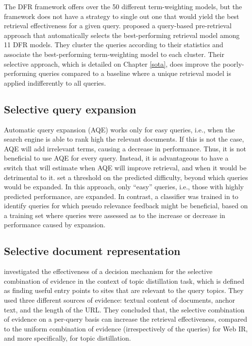 The DFR framework offers over the 50 different term-weighting models, but the framework does not have a strategy to single out one that would yield the best retrieval effectiveness for a given query.
\citet{uglasgow.robust,ModelSelection} proposed a query-based pre-retrieval approach that automatically selects the best-performing retrieval model among 11 DFR models. 
They cluster the queries according to their statistics and associate the best-performing term-weighting model to each cluster. 
Their selective approach, which is detailed on Chapter \ref{sota}, does improve the poorly-performing queries compared to a baseline where a unique retrieval model is applied indifferently to all queries.

\subsection{Selective query expansion}
Automatic query expansion (AQE) works only for easy queries, i.e., when the search engine is able to rank high the relevant documents. 
If this is not the case, AQE will add irrelevant terms, causing a decrease in performance. Thus, it is not beneficial to use AQE for every query. 
Instead, it is advantageous to have a switch that will estimate when AQE will improve retrieval, and when it would be detrimental to it.
\citet*{Amati04querydifficulty} set a threshold on the predicted difficulty, beyond which queries would be expanded. 
In this approach, only ``easy'' queries, i.e., those with highly predicted performance, are expanded. 
In contrast, a classifier was trained in \citep{Yom05} to identify queries for which pseudo relevance feedback might be beneficial, based on a training set where queries were assessed as to the increase or decrease in performance caused by expansion.

\subsection{Selective document representation}
\citet{SelTopicDist,SelectiveTopicDistillation} investigated the effectiveness of a decision mechanism for the selective combination of evidence in the context of topic distillation task,
which is defined as finding useful entry points to sites that are relevant to the query topics.
They used three different sources of evidence: textual content of documents, anchor text, and the length of the URL.
They concluded that, the selective combination of evidence on a per-query basis can increase the retrieval effectiveness, compared to the uniform combination of evidence (irrespectively of the queries) for Web IR, and more specifically, for topic distillation.

